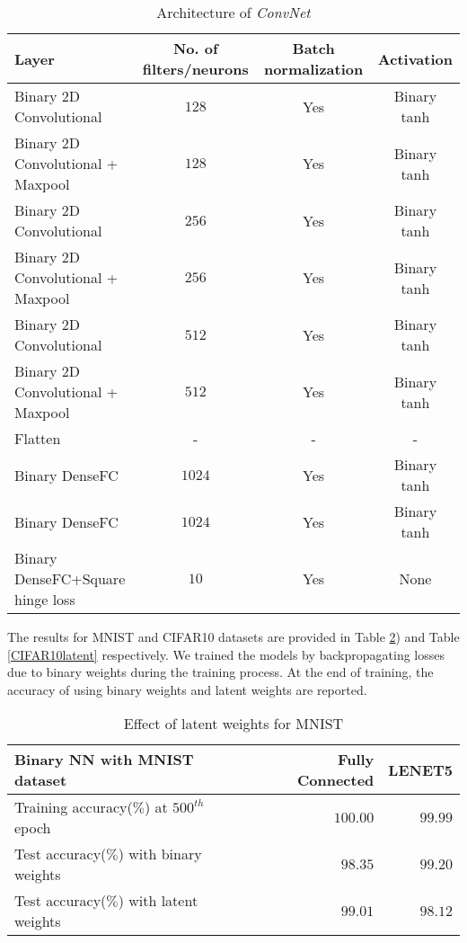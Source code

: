 \begin{table}[ht]
  \caption{Architecture of \textit{ConvNet}}
  \label{ConvNet}
  \centering
  \begin{tabular}{lccc}
    \hline
    Layer  &  No. of filters/neurons & Batch normalization & Activation \\
    \midrule
    Binary 2D Convolutional &  $128$  & Yes & Binary tanh   \\
    Binary 2D Convolutional + Maxpool &  $128$  & Yes & Binary tanh  \\
    Binary 2D Convolutional &  $256$  & Yes & Binary tanh  \\
    Binary 2D Convolutional + Maxpool &  $256$  & Yes  & Binary tanh \\
    Binary 2D Convolutional  &  $512$  & Yes  & Binary tanh \\
    Binary 2D Convolutional + Maxpool &  $512$  & Yes  & Binary tanh \\
    Flatten & - & - & - \\
    Binary DenseFC  & $1024$ & Yes & Binary tanh\\
    Binary DenseFC  & $1024$ & Yes & Binary tanh\\
    Binary DenseFC+Square hinge loss  & $10$ & Yes & None\\
    \bottomrule
  \end{tabular}
\end{table}

The results for MNIST and CIFAR10 datasets are provided in Table \ref{MNISTlatent}) and Table \ref{CIFAR10latent} respectively. We trained the models by backpropagating losses due to binary weights during the training process. At the end of training, the accuracy of using binary weights and latent weights are reported.
\begin{table}[ht]
  \caption{Effect of latent weights for MNIST}
  \label{MNISTlatent}
  \centering
  \begin{tabular}{lrr}
  \hline
    Binary NN with MNIST dataset     & Fully Connected     & LENET5 \\
    \midrule
    Training accuracy($\%$) at $500^{th}$ epoch &  $100.00$  & $99.99$    \\
    Test accuracy($\%$) with binary weights   & $98.35$ & $99.20$      \\
    Test accuracy($\%$) with latent weights     & $99.01$       & $98.12$  \\
    \bottomrule
  \end{tabular}
\end{table}



